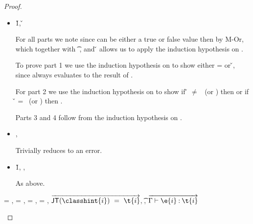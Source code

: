 \begin{lemma}
\begin{proof}
\begin{case}[T-Do]
\begin{itemize}
  \item[] \begin{subcase}[B-Do]
  \opsem {\openv{}} {} {\v{1}},
  \opsem {\openv{}} {} {\v{}}

For all parts we note 
    since {} can be either a true or false value
    then
    {}
    by M-Or,
    which together with 
           {} {\t{}}
           {\filterset {\thenprop {\prop{}}} {\elseprop {\prop{}}}} 
           {\object{}},
    and
  \opsem {\openv{}} {} {\v{}}
    allows us to apply the induction hypothesis on .

To prove part 1 we use the induction hypothesis on 
to show either \object{} = \emptyobject{} 
or \inopenv {\openv{}} {\object{}} {\v{}}, since \e{} always
evaluates to the result of .

For part 2 we use the induction hypothesis on 
to show if \v{} $\not=$ \false\ (or \nil) then
        {\satisfies{\openv{}}{\thenprop{\prop{}}}}
        or
  if \v{} = \false\ (or \nil) then
        {\satisfies{\openv{}}{\elseprop{\prop{}}}}.

Parts 3 and 4 follow from the induction hypothesis on .
    \end{subcase}
  \item[]

\begin{subcase}[BE-Do1]
  \opsem {\openv{}} {} {},
  \opsem {\openv{}} {\e{}} {\errorval{\v{}}}

        Trivially reduces to an error.
\end{subcase}
  \item[]
\begin{subcase}[BE-Do2]
  \opsem {\openv{}} {} {\v{1}},
  \opsem {\openv{}} {} {\errorvalv{}},
  \opsem {\openv{}} {\e{}} {\errorvalv{}}

        As above.
\end{subcase}
\end{itemize}
\end{case}

\begin{case}[T-NewStatic]
  \e{} = { {\classhint{}} 
                                                          {\class{}} {}},
  \object{} = \emptyobject{},
\thenprop{\prop{}} = \topprop{},
\elseprop{\prop{}} = \botprop{},
   $\overrightarrow{
\javatotc {\classhint{i}}
          {\t{i}}
          }$,
  \javatotc {\classhint{}}
            {\t{}},
            $
  \overrightarrow{
  \judgementtwo {\propenv{}}
                    {\e{i}} {\t{i}}
                  }$


\end{case}
\end{proof}
\end{lemma}
